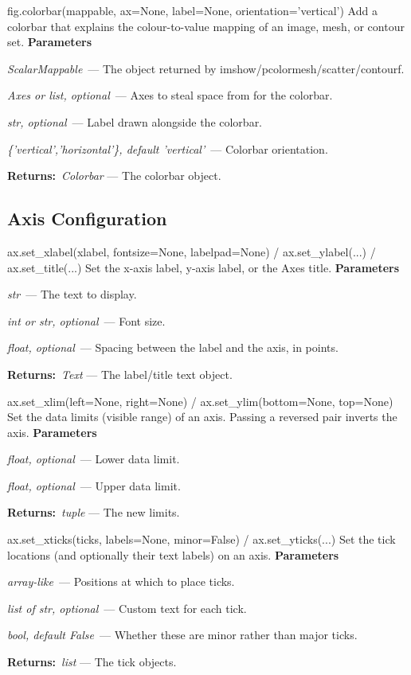 \documentclass[10pt]{article}
\newenvironment{params}
  {\smallskip\textbf{\small\color{accent}Parameters}\par\nopagebreak
   \begin{description}[leftmargin=1.3em,itemsep=1.5pt,parsep=0pt,topsep=1pt,
      labelindent=0pt,style=sameline,font=\normalfont]}
  {\end{description}}
\newcommand{\pitem}[3]{\item[{\ttfamily\color{accent}#1}]{\itshape #2}\ --- #3}
\newcommand{\preturn}[2]{\smallskip\textbf{\small\color{accent}Returns:}\ {\itshape #1} --- #2\par}
\begin{document}
\begin{func}{fig.colorbar(mappable, ax=None, label=None, orientation='vertical')}
Add a colorbar that explains the colour-to-value mapping of an image, mesh, or contour set.
\begin{params}
\pitem{mappable}{ScalarMappable}{The object returned by imshow/pcolormesh/scatter/contourf.}
\pitem{ax}{Axes or list, optional}{Axes to steal space from for the colorbar.}
\pitem{label}{str, optional}{Label drawn alongside the colorbar.}
\pitem{orientation}{\{'vertical','horizontal'\}, default 'vertical'}{Colorbar orientation.}
\end{params}
\preturn{Colorbar}{The colorbar object.}
\end{func}
\medskip

\subsection{Axis Configuration}
\begin{func}{ax.set\_xlabel(xlabel, fontsize=None, labelpad=None)   /   ax.set\_ylabel(...)   /   ax.set\_title(...)}
Set the x-axis label, y-axis label, or the Axes title.
\begin{params}
\pitem{xlabel / ylabel / label}{str}{The text to display.}
\pitem{fontsize}{int or str, optional}{Font size.}
\pitem{labelpad}{float, optional}{Spacing between the label and the axis, in points.}
\end{params}
\preturn{Text}{The label/title text object.}
\end{func}
\medskip

\begin{func}{ax.set\_xlim(left=None, right=None)   /   ax.set\_ylim(bottom=None, top=None)}
Set the data limits (visible range) of an axis. Passing a reversed pair inverts the axis.
\begin{params}
\pitem{left / bottom}{float, optional}{Lower data limit.}
\pitem{right / top}{float, optional}{Upper data limit.}
\end{params}
\preturn{tuple}{The new limits.}
\end{func}
\medskip

\begin{func}{ax.set\_xticks(ticks, labels=None, minor=False)   /   ax.set\_yticks(...)}
Set the tick locations (and optionally their text labels) on an axis.
\begin{params}
\pitem{ticks}{array-like}{Positions at which to place ticks.}
\pitem{labels}{list of str, optional}{Custom text for each tick.}
\pitem{minor}{bool, default False}{Whether these are minor rather than major ticks.}
\end{params}
\preturn{list}{The tick objects.}
\end{func}
\medskip
\end{document}
